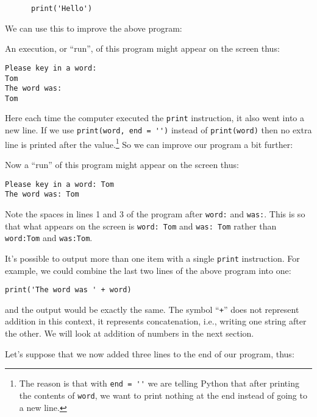 \begin{Verbatim}
      print('Hello')
\end{Verbatim}

We can use this to improve the above program:


An execution, or ``run'', of this program might appear on the screen thus:
\begin{Verbatim}
Please key in a word:
Tom
The word was:
Tom
\end{Verbatim}

Here each time the computer executed the \verb!print! instruction,
it also went into a new line.
If we use \verb!print(word, end = '')! instead of \verb!print(word)!
then no extra line is printed after the value.\footnote{The reason is that
 with \Verb!end = ''! we are telling Python that after printing the contents
 of \Verb!word!, we want to print nothing at the end instead of going to a
 new line.}
So we can improve our program a bit further:


Now a ``run'' of this program might appear on the screen thus:
\begin{Verbatim}
Please key in a word: Tom
The word was: Tom
\end{Verbatim}

Note the spaces in lines 1 and 3 of the program after \verb!word:! and \verb!was:!.
This is so that what appears on the screen is \verb!word: Tom! and
\verb!was: Tom! rather than \verb!word:Tom! and \verb!was:Tom!.

It's possible to output more than one item with a single \verb!print! instruction.
For example, we could combine the last two lines of the above program into one:

\begin{Verbatim}
print('The word was ' + word)
\end{Verbatim}

and the output would be exactly the same. The symbol ``\texttt{+}'' does not
represent addition in this context, it represents concatenation, i.e.,
writing one string after the other. We will look at addition of numbers in the next section.


Let's suppose that we now added three lines to the end of our program, thus:


